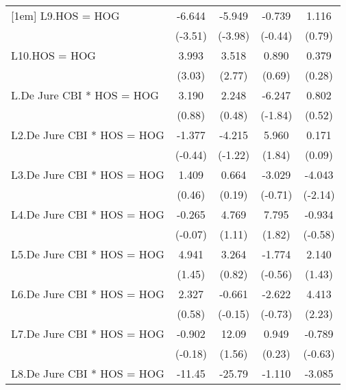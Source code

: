 {\begin{longtable}{l*{4}{c}}
[1em]
L9.HOS = HOG    &   -6.644\sym{***}&   -5.949\sym{***}&   -0.739         &    1.116         \\
                &  (-3.51)         &  (-3.98)         &  (-0.44)         &   (0.79)         \\
[1em]
L10.HOS = HOG   &    3.993\sym{**} &    3.518\sym{**} &    0.890         &    0.379         \\
                &   (3.03)         &   (2.77)         &   (0.69)         &   (0.28)         \\
[1em]
L.De Jure CBI * HOS = HOG&    3.190         &    2.248         &   -6.247         &    0.802         \\
                &   (0.88)         &   (0.48)         &  (-1.84)         &   (0.52)         \\
[1em]
L2.De Jure CBI * HOS = HOG&   -1.377         &   -4.215         &    5.960         &    0.171         \\
                &  (-0.44)         &  (-1.22)         &   (1.84)         &   (0.09)         \\
[1em]
L3.De Jure CBI * HOS = HOG&    1.409         &    0.664         &   -3.029         &   -4.043\sym{*}  \\
                &   (0.46)         &   (0.19)         &  (-0.71)         &  (-2.14)         \\
[1em]
L4.De Jure CBI * HOS = HOG&   -0.265         &    4.769         &    7.795         &   -0.934         \\
                &  (-0.07)         &   (1.11)         &   (1.82)         &  (-0.58)         \\
[1em]
L5.De Jure CBI * HOS = HOG&    4.941         &    3.264         &   -1.774         &    2.140         \\
                &   (1.45)         &   (0.82)         &  (-0.56)         &   (1.43)         \\
[1em]
L6.De Jure CBI * HOS = HOG&    2.327         &   -0.661         &   -2.622         &    4.413\sym{*}  \\
                &   (0.58)         &  (-0.15)         &  (-0.73)         &   (2.23)         \\
[1em]
L7.De Jure CBI * HOS = HOG&   -0.902         &    12.09         &    0.949         &   -0.789         \\
                &  (-0.18)         &   (1.56)         &   (0.23)         &  (-0.63)         \\
[1em]
L8.De Jure CBI * HOS = HOG&   -11.45\sym{*}  &   -25.79\sym{***}&   -1.110         &   -3.085         \\

\end{longtable}}

